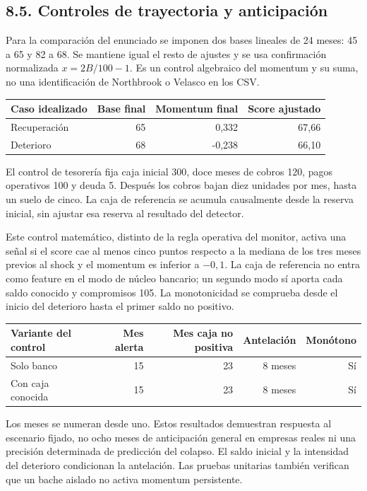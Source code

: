 \subsection*{8.5. Controles de trayectoria y anticipación}
Para la comparación del enunciado se imponen dos bases lineales de 24 meses: 45 a 65 y 82 a 68. Se mantiene igual el resto de ajustes y se usa confirmación normalizada $x=2B/100-1$. Es un control algebraico del momentum y su suma, no una identificación de Northbrook o Velasco en los CSV.

\begin{center}
\small
\begin{tabular}{lrrr}
\hline
Caso idealizado & Base final & Momentum final & Score ajustado \\
\hline
Recuperación & 65 & 0,332 & 67,66 \\
Deterioro & 68 & -0,238 & 66,10 \\
\hline
\end{tabular}
\end{center}

El control de tesorería fija caja inicial 300, doce meses de cobros 120, pagos operativos 100 y deuda 5. Después los cobros bajan diez unidades por mes, hasta un suelo de cinco. La caja de referencia se acumula causalmente desde la reserva inicial, sin ajustar esa reserva al resultado del detector.

Este control matemático, distinto de la regla operativa del monitor, activa una señal si el score cae al menos cinco puntos respecto a la mediana de los tres meses previos al shock y el momentum es inferior a $-0{,}1$. La caja de referencia no entra como feature en el modo de núcleo bancario; un segundo modo sí aporta cada saldo conocido y compromisos 105. La monotonicidad se comprueba desde el inicio del deterioro hasta el primer saldo no positivo.

\begin{center}
\small
\begin{tabular}{p{4cm}rrrr}
\hline
Variante del control & Mes alerta & Mes caja no positiva & Antelación & Monótono \\
\hline
Solo banco & 15 & 23 & 8 meses & Sí \\
Con caja conocida & 15 & 23 & 8 meses & Sí \\
\hline
\end{tabular}
\end{center}

Los meses se numeran desde uno. Estos resultados demuestran respuesta al escenario fijado, no ocho meses de anticipación general en empresas reales ni una precisión determinada de predicción del colapso. El saldo inicial y la intensidad del deterioro condicionan la antelación. Las pruebas unitarias también verifican que un bache aislado no activa momentum persistente.

